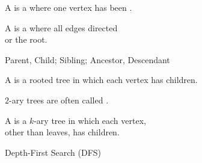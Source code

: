 
\begin{frame}{}
  \begin{definition}
    A  is a 
    where one vertex has been .
  \end{definition}


  \pause
  \begin{definition}
    A  is a 
    where all edges directed \\  or  the root.
  \end{definition}
\end{frame}

\begin{frame}{}
  \begin{definition}
    Parent, Child; \quad Sibling; \quad Ancestor, Descendant
  \end{definition}

  \pause
  \vspace{0.50cm}
  \begin{definition}
    A  is a rooted tree
    in which each vertex has  children.

    \vspace{0.20cm}
    $2$-ary trees are often called .
  \end{definition}

  \pause
  \vspace{0.50cm}
  \begin{definition}
    A  is a $k$-ary tree in which each vertex, \\
    other than leaves, has  children.
  \end{definition}
\end{frame}

\begin{frame}{}

  \begin{center}
    Depth-First Search (DFS)
  \end{center}
\end{frame}

